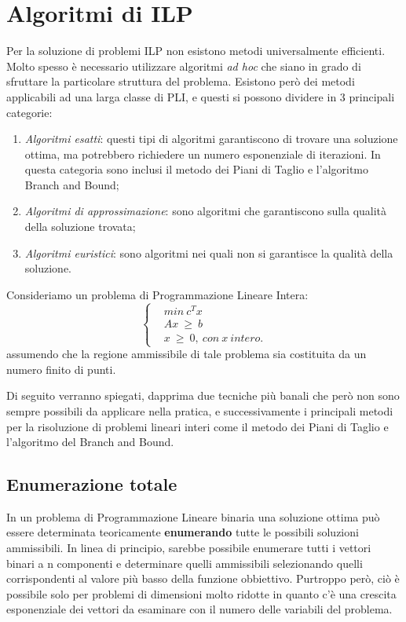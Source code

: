 \section{Algoritmi di ILP}
Per la soluzione di problemi ILP non esistono metodi universalmente efficienti. Molto spesso è necessario utilizzare algoritmi \textit{ad hoc} che siano in grado di sfruttare la particolare struttura del problema.
Esistono però dei metodi applicabili ad una larga classe di PLI, e questi si possono dividere in 3 principali categorie:
\begin{enumerate}
\item \textit{Algoritmi esatti}: questi tipi di algoritmi garantiscono di trovare una soluzione ottima, ma potrebbero richiedere un numero esponenziale di iterazioni. In questa categoria sono inclusi il metodo dei Piani di Taglio e l'algoritmo Branch and Bound;
\item \textit{Algoritmi di approssimazione}: sono algoritmi che garantiscono sulla qualità della soluzione trovata;
\item \textit{Algoritmi euristici}: sono algoritmi nei quali non si garantisce la qualità della soluzione.
\end{enumerate} 

Consideriamo un problema di Programmazione Lineare Intera:
\begin{equation}
\label{eq:progLinInt}
\begin{cases}
& min ~ c^T x \\
& Ax ~ \geq ~ b \\
& x ~ \geq ~ 0, ~ con ~ x ~ intero.
\end{cases}
\end{equation}
assumendo che la regione ammissibile di tale problema sia costituita da un numero finito di punti.

Di seguito verranno spiegati, dapprima due tecniche più banali che però non sono sempre possibili da applicare nella pratica, e successivamente i principali metodi per la risoluzione di problemi lineari interi come il metodo dei Piani di Taglio e l'algoritmo del Branch and Bound.

\subsection{Enumerazione totale}
In un problema di Programmazione Lineare binaria una soluzione ottima può essere determinata teoricamente \textbf{enumerando} tutte le possibili soluzioni ammissibili. In linea di principio, sarebbe possibile enumerare tutti i vettori binari a n componenti e determinare quelli ammissibili selezionando quelli corrispondenti al valore più basso della funzione obbiettivo.
Purtroppo però, ciò è possibile solo per problemi di dimensioni molto ridotte in quanto c'è una crescita esponenziale dei vettori da esaminare con il numero delle variabili del problema.

